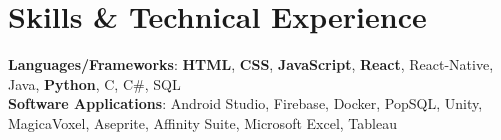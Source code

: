 \documentclass[letterpaper,11pt]{article}
\begin{document}
\section{Skills \& Technical Experience}
\begin{itemize}[leftmargin=0.15in, label={}]
  \small{\item{
  \vspace{1mm}
    \textbf{Languages/Frameworks}{: \textbf{HTML}, \textbf{CSS}, \textbf{JavaScript}, \textbf{React}, React-Native, Java, \textbf{Python}, C, C\#, SQL} \\
    \vspace{1mm}
    \textbf{Software Applications}{: Android Studio, Firebase, Docker, PopSQL, Unity, MagicaVoxel, Aseprite, Affinity Suite, Microsoft Excel, Tableau} \\
  }}
\end{itemize}





\end{document}
